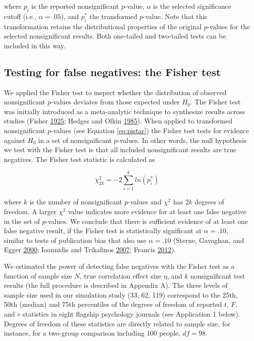 \documentclass[a5paper]{book}
\begin{document}
where \(p_i\) is the reported nonsignificant \(p\)-value, \(\alpha\) is
the selected significance cutoff (i.e., \(\alpha=.05\)), and \(p^*_i\)
the transformed \(p\)-value. Note that this transformation retains the
distributional properties of the original \(p\)-values for the selected
nonsignificant results. Both one-tailed and two-tailed tests can be
included in this way.

\subsection{Testing for false negatives: the Fisher
test}\label{testing-for-false-negatives-the-fisher-test}

We applied the Fisher test to inspect whether the distribution of
observed nonsignificant \(p\)-values deviates from those expected under
\(H_0\). The Fisher test was initially introduced as a meta-analytic
technique to synthesize results across studies (Fisher
\protect\hyperlink{ref-Fisher1925-jl}{1925}; Hedges and Olkin
\protect\hyperlink{ref-Hedges1985-dy}{1985}). When applied to
transformed nonsignificant \(p\)-values (see Equation \eqref{eq:pistar})
the Fisher test tests for evidence against \(H_0\) in a set of
nonsignificant \(p\)-values. In other words, the null hypothesis we test
with the Fisher test is that all included nonsignificant results are
true negatives. The Fisher test statistic is calculated as

\begin{equation}
\chi^2_{2k}=-2\sum\limits^k_{i=1}ln(p^*_i)
\label{eq:fishertest}
\end{equation}

where \(k\) is the number of nonsignificant \(p\)-values and \(\chi^2\)
has \(2k\) degrees of freedom. A larger \(\chi^2\) value indicates more
evidence for at least one false negative in the set of \(p\)-values. We
conclude that there is sufficient evidence of at least one false
negative result, if the Fisher test is statistically significant at
\(\alpha=.10\), similar to tests of publication bias that also use
\(\alpha=.10\) (Sterne, Gavaghan, and Egger
\protect\hyperlink{ref-doi:10.1016ux2fs0895-43560000242-0}{2000};
Ioannidis and Trikalinos
\protect\hyperlink{ref-doi:10.1177ux2f1740774507079441}{2007}; Francis
\protect\hyperlink{ref-doi:10.3758ux2fs13423-012-0227-9}{2012}).

We estimated the power of detecting false negatives with the Fisher test
as a function of sample size \(N\), true correlation effect size
\(\eta\), and \(k\) nonsignificant test results (the full procedure is
described in Appendix A). The three levels of sample size used in our
simulation study (33, 62, 119) correspond to the 25th, 50th (median) and
75th percentiles of the degrees of freedom of reported \(t\), \(F\), and
\(r\) statistics in eight flagship psychology journals (see Application
1 below). Degrees of freedom of these statistics are directly related to
sample size, for instance, for a two-group comparison including 100
people, \(df=98\).
\end{document}
